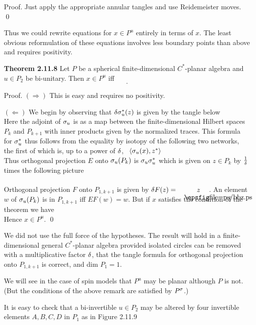 \bs
{\sc Proof.}  Just apply the appropriate annular tangles
and use Reidemeister moves. \qed

\bs Thus we could rewrite equations for $x\in P^u$ entirely in
terms of $x$. The least obvious reformulation of these equations
involves less boundary points than above and requires positivity.

\bs\ni
{\bf Theorem 2.11.8} Let $P$ be a spherical finite-dimensional
$C^*$-planar algebra and $u\in P_2$ be bi-unitary. Then $x\in P^u$
iff
\[
	.
\]

\bs
{\sc Proof.}  $(\Rightarrow)$ This is easy and requires no
positivity.

$(\Leftarrow)$ We begin by observing that
$\delta\sigma^*_u(z)$ is given by the tangle below
\[
	
\]
\ni Here the adjoint of $\sigma_u$ is as a map between the
finite-dimensional Hilbert spaces $P_k$ and $P_{k+1}$ with inner
products given by the normalized traces.  This formula for $\sigma^*_u$
thus follows from the equality by isotopy of the following two
networks, the first of which is, up to a power of $\delta$,  \
$\langle\sigma_u(x),z^*\rangle$
\[
	
\]
\ni Thus orthogonal projection $E$ onto $\sigma_u(P_k)$ is
$\sigma_u\sigma^*_u$ which is given on $z\in P_k$ by $\frac 1{\delta}$ times the
following picture
\[
	
\]
\ni Orthogonal projection $F$ onto $P_{1,k+1}$ is given by
$\d F(z)= \quad \boxh{z}$.
An element $w$ of $\sigma_u(P_k)$ is in $P_{1,k+1}$  iff
$EF(w)=w$. But if $x$ satisfies the condition of the theorem we have
\bs
\[
	
\]
Hence $x\in P^u$. \qed

 We did not use the full force of the hypotheses.
The result will hold in a finite-dimensional general $C^*$-planar
algebra provided isolated circles can be removed with a
multiplicative factor $\delta$, that the tangle formula for orthogonal
projection onto $P_{1,k+1}$ is correct, and dim $P_1=1$.

We will see in the case of spin models that $P^u$ may be planar
although $P$ is not. (But the conditions of the above remark are
satisfied by $P^\sigma$.)

It is easy to check that a bi-invertible $u\in P_2$ may be altered
by four invertible elements $A,B,C,D$ in $P_1$ as in Figure 2.11.9
\begin{figure}
\[
	
\]
\caption[2.11.9]{}\label{pic60}
\end{figure}
\bs

